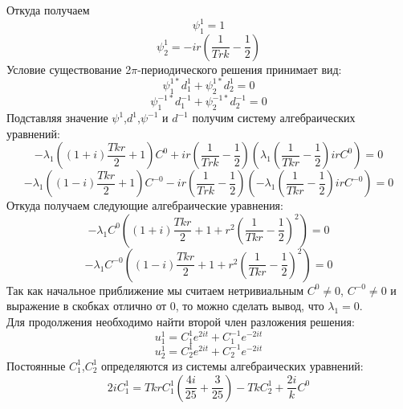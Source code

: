 \documentclass[12pt]{article}
\begin{document}
 Откуда получаем
 \begin{equation*}
     \psi_1^1 =1
 \end{equation*}
 \begin{equation*}
     \psi_2^1=-i r \left(  \frac{1}{T r k} - \frac{1}{2}\right)
 \end{equation*}
Условие существование 2$\pi$-периодического решения принимает вид:
\begin{equation}
    \psi_1^{1*} d^1_1+\psi_2^{1*} d^1_2 =0
\end{equation}
\begin{equation*}
    \psi_1^{-1*} d^{-1}_1+\psi_2^{-1*} d^{-1}_2 =0
\end{equation*}
Подставляя значение $\psi^1$,$d^1$,$\psi^{-1}$ и $d^{-1}$ получим систему алгебраических уравнений:
\begin{equation*}
  -\lambda_1 \left((1+i)\frac{T k r}{2} + 1\right) C^0 +i r \left(  \frac{1}{T r k} - \frac{1}{2}\right) (\lambda_1 \left ( \frac{1}{T k r}-\frac{1}{2} \right) i r C^0)  =0
\end{equation*}
\begin{equation*}
  -\lambda_1 \left((1-i)\frac{T k r}{2} + 1\right) C^{-0} -i r \left(  \frac{1}{T r k} - \frac{1}{2}\right) (-\lambda_1 \left ( \frac{1}{T k r}-\frac{1}{2} \right) i r C^{-0})  =0
\end{equation*}
Откуда получаем следующие алгебраические уравнения:
\begin{equation*}
  -\lambda_1 C^0 \left( (1+i)\frac{T k r}{2} + 1 +r^2 \left ( \frac{1}{T k r}-\frac{1}{2} \right)^2 \right)  =0
\end{equation*}
\begin{equation*}
    -\lambda_1 C^{-0} \left( (1-i)\frac{T k r}{2} + 1 +r^2 \left ( \frac{1}{T k r}-\frac{1}{2} \right)^2 \right)  =0
\end{equation*}
Так как начальное приближение мы считаем нетривиальным $C^0 \neq 0$, $C^{-0} \neq 0$ и выражение в скобках отлично от 0, то можно сделать вывод, что $\lambda_1 =0 $. \\
Для продолжения необходимо найти второй член разложения решения:
\begin{equation*}
     u^1_1= C_1^1 e^{2 i t}+ C_1^{-1} e^{-2 i t}
  \end{equation*}
  \begin{equation*}
     u^1_2= C_2^1 e^{2 i t}+ C_2^{-1} e^{-2 i t}
  \end{equation*}
  Постоянные $C_1^1$,$C_2^1$ определяются из системы алгебраических уравнений:
  \begin{equation*}
     2i C_1^1=T k r C_1^1( \frac{4i}{25}+\frac{3}{25})- T k C_2^1 + \frac{2i}{k} C^0
 \end{equation*}
\end{document}
